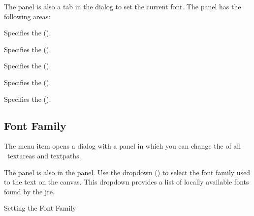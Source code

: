 The  panel is also a tab
in the  dialog to set the current
\gls{font}. The panel has the following areas:
\begin{deflist}
\begin{itemdesc}
Specifies the  ().
\end{itemdesc}

\begin{itemdesc}
Specifies the  ().
\end{itemdesc}

\begin{itemdesc}
Specifies the  ().
\end{itemdesc}

\begin{itemdesc}
Specifies the  ().
\end{itemdesc}

\begin{itemdesc}
Specifies the  ().
\end{itemdesc}

\end{deflist}

\subsection{Font Family}\label{sec:fontfamily}


The  menu item opens a dialog with a 
 panel in which you can change the
of all \selected\ \glspl{textarea} and \glspl{textpath}.


The  panel is also in the 
panel. Use the \gls{dropdown} () to
select the font family used to  the
text on the \gls{canvas}.  This \gls{dropdown} provides a list of
locally available fonts found by the \gls{jre}.

{}
{Setting the Font Family}


